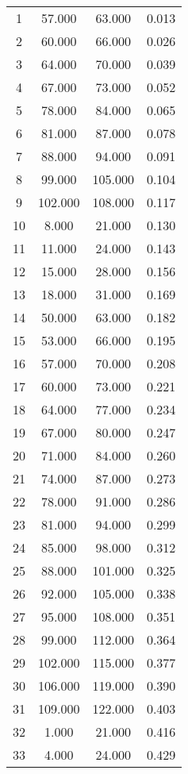 % 
\begin{tabular}{cccc}
  \hline
  \hline
1 & 57.000 & 63.000 & 0.013 \\ 
  2 & 60.000 & 66.000 & 0.026 \\ 
  3 & 64.000 & 70.000 & 0.039 \\ 
  4 & 67.000 & 73.000 & 0.052 \\ 
  5 & 78.000 & 84.000 & 0.065 \\ 
  6 & 81.000 & 87.000 & 0.078 \\ 
  7 & 88.000 & 94.000 & 0.091 \\ 
  8 & 99.000 & 105.000 & 0.104 \\ 
  9 & 102.000 & 108.000 & 0.117 \\ 
  10 & 8.000 & 21.000 & 0.130 \\ 
  11 & 11.000 & 24.000 & 0.143 \\ 
  12 & 15.000 & 28.000 & 0.156 \\ 
  13 & 18.000 & 31.000 & 0.169 \\ 
  14 & 50.000 & 63.000 & 0.182 \\ 
  15 & 53.000 & 66.000 & 0.195 \\ 
  16 & 57.000 & 70.000 & 0.208 \\ 
  17 & 60.000 & 73.000 & 0.221 \\ 
  18 & 64.000 & 77.000 & 0.234 \\ 
  19 & 67.000 & 80.000 & 0.247 \\ 
  20 & 71.000 & 84.000 & 0.260 \\ 
  21 & 74.000 & 87.000 & 0.273 \\ 
  22 & 78.000 & 91.000 & 0.286 \\ 
  23 & 81.000 & 94.000 & 0.299 \\ 
  24 & 85.000 & 98.000 & 0.312 \\ 
  25 & 88.000 & 101.000 & 0.325 \\ 
  26 & 92.000 & 105.000 & 0.338 \\ 
  27 & 95.000 & 108.000 & 0.351 \\ 
  28 & 99.000 & 112.000 & 0.364 \\ 
  29 & 102.000 & 115.000 & 0.377 \\ 
  30 & 106.000 & 119.000 & 0.390 \\ 
  31 & 109.000 & 122.000 & 0.403 \\ 
  32 & 1.000 & 21.000 & 0.416 \\ 
  33 & 4.000 & 24.000 & 0.429 \\ 

\end{tabular}
